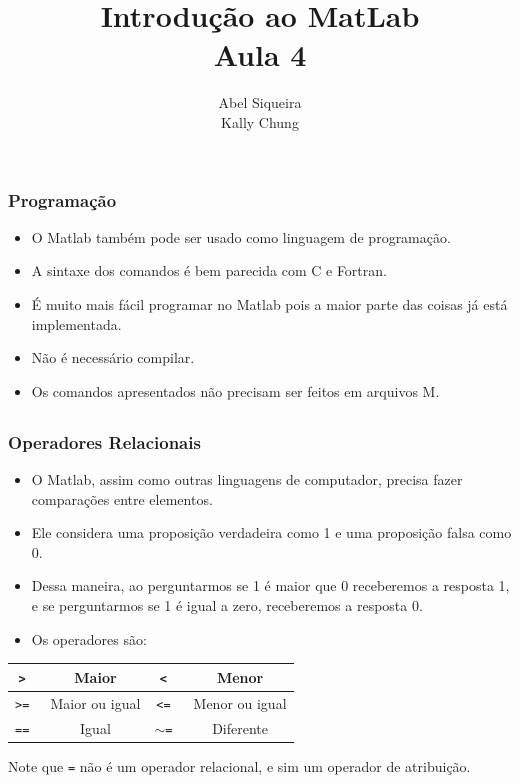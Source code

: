 \documentclass{beamer}
\title{Introdu\c{c}\~ao ao MatLab \\ Aula 4}
\author{Abel Siqueira \\ Kally Chung}
\date{}
\begin{document}
\frame{\titlepage}

\section[Programa\c{c}\~ao]{}

\begin{frame}
 \frametitle{Programa\c{c}\~ao}

\begin{itemize}
 \item O Matlab tamb\'em pode ser usado como linguagem de programa\c{c}\~ao.
 \item A sintaxe dos comandos \'e bem parecida com C e Fortran.
 \item \'E muito mais f\'acil programar no Matlab pois a maior parte das coisas j\'a est\'a implementada.
 \item N\~ao \'e necess\'ario compilar.
 \item Os comandos apresentados n\~ao precisam ser feitos em arquivos M.
\end{itemize}

\end{frame}

\subsection[Operadores Relacionais]{}

\begin{frame}
\frametitle{Operadores Relacionais}

\begin{itemize}
 \item<1-> O Matlab, assim como outras linguagens de computador, precisa fazer compara\c{c}\~oes entre elementos.
 \item<2-> Ele considera uma proposi\c{c}\~ao verdadeira como 1 e uma proposi\c{c}\~ao falsa como 0.
 \item<3-> Dessa maneira, ao perguntarmos se 1 \'e maior que 0 receberemos a resposta 1, e se perguntarmos se 1 \'e igual a zero, receberemos a resposta 0.
 \item<4-> Os operadores s\~ao:
\end{itemize}
\pause \pause \pause \pause
{\scriptsize
\begin{center}
\begin{tabular}{|c|c|c|c|}
\hline
{\tt > } & Maior & {\tt < } & Menor \\ \hline
{\tt >= } & Maior ou igual & {\tt <= } & Menor ou igual \\ \hline
{\tt == } & Igual & {\tt $\sim$= } & Diferente \\ \hline
\end{tabular}
\end{center}
}
\pause
Note que {\tt =} n\~ao \'e um operador relacional, e sim um operador de atribui\c{c}\~ao.
\end{frame}
\end{document}
